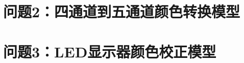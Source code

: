 \section[\hspace{-2pt}问题2：四通道到五通道颜色转换模型]{{\heiti{} \hspace{-8pt}问题2：四通道到五通道颜色转换模型}}\label{section3: 问题2：四通道到五通道颜色转换模型}

\section[\hspace{-2pt}问题3：LED显示器颜色校正模型]{{\heiti{} \hspace{-8pt}问题3：LED显示器颜色校正模型}}\label{section3: 问题3：LED显示器颜色校正模型}